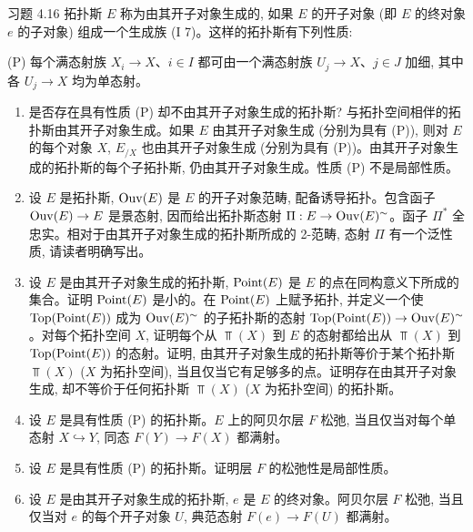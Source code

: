\begin{enonce*}[remark]{习题 4.16}
拓扑斯 $E$ 称为由其开子对象生成的, 如果 $E$ 的开子对象 (即 $E$ 的终对象 $e$ 的子对象) 组成一个生成族 (I 7)。这样的拓扑斯有下列性质:

\noindent
(P) 每个满态射族 $X_i\to X$、$i\in I$ 都可由一个满态射族 $U_j\to X$、$j\in J$ 加细, 其中各 $U_j\to X$ 均为单态射。

\begin{enumerate}
\renewcommand{\theenumi}{\alph{enumi}}
\renewcommand{\labelenumi}{\theenumi)}
\item 是否存在\pageoriginale 具有性质 (P) 却不由其开子对象生成的拓扑斯? 与拓扑空间相伴的拓扑斯由其开子对象生成。如果 $E$ 由其开子对象生成 (分别为具有 (P)), 则对 $E$ 的每个对象 $X$, $E_{/X}$ 也由其开子对象生成 (分别为具有 (P))。由其开子对象生成的拓扑斯的每个子拓扑斯, 仍由其开子对象生成。性质 (P) 不是局部性质。

\item 设 $E$ 是拓扑斯, $\operatorname{Ouv}(E)$ 是 $E$ 的开子对象范畴, 配备诱导拓扑。包含函子 $\Ouv(E)\to E$ 是景态射, 因而给出拓扑斯态射 $\Pi:E\to\Ouv(E)^{\sim}$。函子 $\Pi^{\ast}$ 全忠实。相对于由其开子对象生成的拓扑斯所成的 2-范畴, 态射 $\Pi$ 有一个泛性质, 请读者明确写出。

\item 设 $E$ 是由其开子对象生成的拓扑斯, $\operatorname{Point}(E)$ 是 $E$ 的点在同构意义下所成的集合。证明 $\operatorname{Point}(E)$ 是小的。在 $\operatorname{Point}(E)$ 上赋予拓扑, 并定义一个使 $\operatorname{Top}(\operatorname{Point}(E))$ 成为 $\operatorname{Ouv}(E)^{\sim}$ 的子拓扑斯的态射 $\Top(\Point(E))\to\Ouv(E)^{\sim}$。对每个拓扑空间 $X$, 证明每个从 $\Top(X)$ 到 $E$ 的态射都给出从 $\Top(X)$ 到 $\operatorname{Top}(\operatorname{Point}(E))$ 的态射。证明, 由其开子对象生成的拓扑斯等价于某个拓扑斯 $\Top(X)$ ($X$ 为拓扑空间), 当且仅当它有足够多的点。证明存在由其开子对象生成, 却不等价于任何拓扑斯 $\Top(X)$ ($X$ 为拓扑空间) 的拓扑斯。

\item 设 $E$ 是具有性质 (P) 的拓扑斯。$E$ 上的阿贝尔层 $F$ 松弛, 当且仅当对每个单态射 $X\hookrightarrow Y$, 同态 $F(Y)\to F(X)$ 都满射。

\item 设 $E$ 是具有性质 (P) 的拓扑斯。证明层 $F$ 的松弛性是局部性质。

\item 设 $E$ 是由其开子对象生成的拓扑斯, $e$ 是 $E$ 的终对象。阿贝尔层 $F$ 松弛, 当且仅当对 $e$ 的每个开子对象 $U$, 典范态射 $F(e)\to F(U)$ 都满射。
\end{enumerate}
\end{enonce*}

